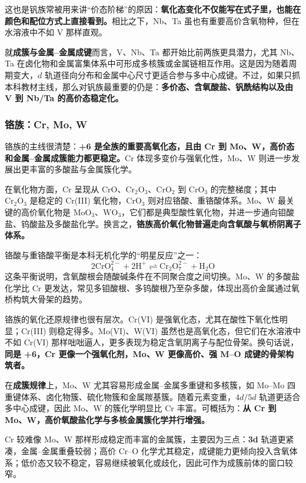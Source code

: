 \documentclass[UTF8]{ctexbook}
\begin{document}
这也是钒族常被用来讲“价态阶梯”的原因：\textbf{氧化态变化不仅能写在式子里，也能在颜色和配位方式上直接看到。}相比之下，Nb、Ta 虽也有重要高价含氧物种，但在水溶液中不如 V 那样直观。

就\textbf{成簇与金属--金属成键}而言，V、Nb、Ta 都开始比前两族更具潜力，尤其 Nb、Ta 在卤化物和金属富集体系中可形成多核簇或金属链相互作用。这是因为随着周期变大，$d$ 轨道径向分布和金属中心尺寸更适合参与多中心成键。不过，如果只抓本科教材主线，那么对钒族最重要的仍是：\textbf{多价态、含氧酸盐、钒酰结构以及由 V 到 Nb/Ta 的高价态稳定化。}

\subsubsection{铬族：Cr, Mo, W}

铬族的主线很清楚：\textbf{+6 是全族的重要高氧化态，且由 Cr 到 Mo、W，高价态和金属--金属成簇能力都更稳定。}Cr 体现多变价与强氧化性，Mo、W 则进一步发展出更丰富的多酸盐与金属簇化学。

在氧化物方面，Cr 呈现从 $\mathrm{CrO}$、$\mathrm{Cr_2O_3}$、$\mathrm{CrO_2}$ 到 $\mathrm{CrO_3}$ 的完整梯度；其中 $\mathrm{Cr_2O_3}$ 是稳定的 Cr(III) 氧化物，$\mathrm{CrO_3}$ 则对应铬酸、重铬酸体系。Mo、W 最关键的高价氧化物是 $\mathrm{MoO_3}$、$\mathrm{WO_3}$，它们都是典型酸性氧化物，并进一步通向钼酸盐、钨酸盐及多酸盐化学。换言之，\textbf{铬族高价氧化物普遍走向含氧酸与氧桥阴离子体系。}

铬酸与重铬酸平衡是本科无机化学的“明星反应”之一：
\[
2\mathrm{CrO_4^{2-}} + 2\mathrm{H^+} \rightleftharpoons \mathrm{Cr_2O_7^{2-}} + \mathrm{H_2O}
\]
这条平衡说明，含氧酸根会随酸碱条件在不同聚合度之间切换。Mo、W 的多酸盐化学比 Cr 更发达，常见多钼酸根、多钨酸根乃至杂多酸，体现出高价金属通过氧桥构筑大骨架的趋势。

铬族的氧化还原规律也很有层次。Cr(VI) 是强氧化态，尤其在酸性下氧化性明显；Cr(III) 则稳定得多。Mo(VI)、W(VI) 虽然也是高氧化态，但它们在水溶液中不如 Cr(VI) 那样咄咄逼人，更多表现为稳定含氧阴离子与配位骨架。换句话说，\textbf{同是 +6，Cr 更像一个强氧化剂，Mo、W 更像高价、强 M--O 成键的骨架构筑者。}

在\textbf{成簇规律}上，Mo、W 尤其容易形成金属--金属多重键和多核簇，如 Mo--Mo 四重键体系、卤化物簇、硫化物簇和金属羰基簇。随着元素变重，$4d/5d$ 轨道更适合多中心成键，因此 Mo、W 的簇化学明显比 Cr 丰富。可概括为：\textbf{从 Cr 到 Mo、W，高价氧酸盐化学与多核金属簇化学并行增强。}

Cr 较难像 Mo、W 那样形成稳定而丰富的金属簇，主要因为三点：\textbf{3d} 轨道更紧凑，金属--金属重叠较弱；高价 Cr--O 化学尤其稳定，成键能力更倾向投入含氧体系；低价态又较不稳定，容易继续被氧化或歧化，因此可作为成簇前体的窗口较窄。
\end{document}
